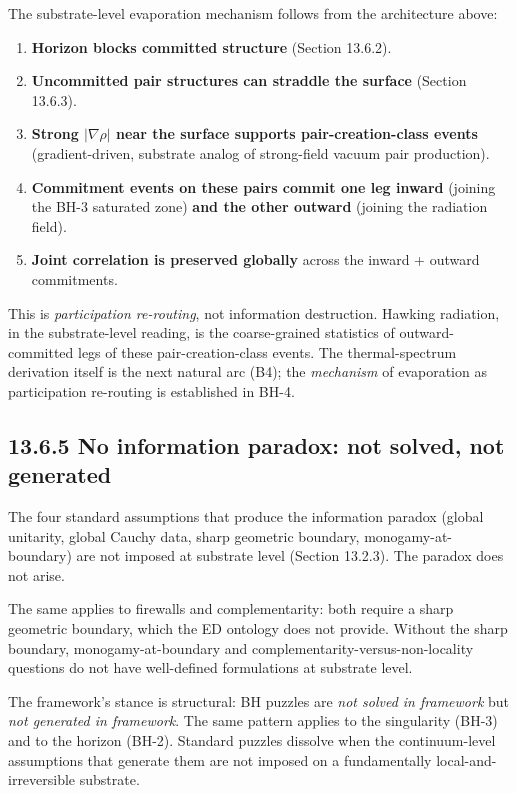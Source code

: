 \documentclass[11pt]{book}
\begin{document}
The substrate-level evaporation mechanism follows from the architecture above:

\begin{enumerate}
\item \textbf{Horizon blocks committed structure} (Section 13.6.2).
\item \textbf{Uncommitted pair structures can straddle the surface} (Section 13.6.3).
\item \textbf{Strong $|\nabla\rho|$ near the surface supports pair-creation-class events} (gradient-driven, substrate analog of strong-field vacuum pair production).
\item \textbf{Commitment events on these pairs commit one leg inward} (joining the BH-3 saturated zone) \textbf{and the other outward} (joining the radiation field).
\item \textbf{Joint correlation is preserved globally} across the inward + outward commitments.
\end{enumerate}

This is \textit{participation re-routing}, not information destruction. Hawking radiation, in the substrate-level reading, is the coarse-grained statistics of outward-committed legs of these pair-creation-class events. The thermal-spectrum derivation itself is the next natural arc (B4); the \textit{mechanism} of evaporation as participation re-routing is established in BH-4.

\subsection{13.6.5 No information paradox: not solved, not generated}

The four standard assumptions that produce the information paradox (global unitarity, global Cauchy data, sharp geometric boundary, monogamy-at-boundary) are not imposed at substrate level (Section 13.2.3). The paradox does not arise.

The same applies to firewalls and complementarity: both require a sharp geometric boundary, which the ED ontology does not provide. Without the sharp boundary, monogamy-at-boundary and complementarity-versus-non-locality questions do not have well-defined formulations at substrate level.

The framework's stance is structural: BH puzzles are \textit{not solved in framework} but \textit{not generated in framework}. The same pattern applies to the singularity (BH-3) and to the horizon (BH-2). Standard puzzles dissolve when the continuum-level assumptions that generate them are not imposed on a fundamentally local-and-irreversible substrate.
\end{document}
